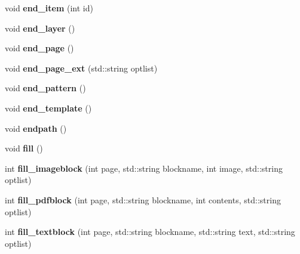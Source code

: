 \begin{DoxyCompactItemize}
\item 
\hypertarget{classPDFlib_a1052c7d1cb2993e32341718e9c36c30c}{void {\bfseries end\-\_\-item} (int id)}\label{classPDFlib_a1052c7d1cb2993e32341718e9c36c30c}

\item 
\hypertarget{classPDFlib_a485ab7dd0996da8194e768e1c97eed21}{void {\bfseries end\-\_\-layer} ()}\label{classPDFlib_a485ab7dd0996da8194e768e1c97eed21}

\item 
\hypertarget{classPDFlib_ad155354f3b07ccf69bc82000211a4018}{void {\bfseries end\-\_\-page} ()}\label{classPDFlib_ad155354f3b07ccf69bc82000211a4018}

\item 
\hypertarget{classPDFlib_aaeb1219f151a8b54e2c02e4e4633856b}{void {\bfseries end\-\_\-page\-\_\-ext} (std\-::string optlist)}\label{classPDFlib_aaeb1219f151a8b54e2c02e4e4633856b}

\item 
\hypertarget{classPDFlib_ac7a93102d044e6c8bd06d2a83c6b66f7}{void {\bfseries end\-\_\-pattern} ()}\label{classPDFlib_ac7a93102d044e6c8bd06d2a83c6b66f7}

\item 
\hypertarget{classPDFlib_a67057f952266b4cbdd737b61a85090f7}{void {\bfseries end\-\_\-template} ()}\label{classPDFlib_a67057f952266b4cbdd737b61a85090f7}

\item 
\hypertarget{classPDFlib_a7d53283bf3787237ca080b1ee6897a26}{void {\bfseries endpath} ()}\label{classPDFlib_a7d53283bf3787237ca080b1ee6897a26}

\item 
\hypertarget{classPDFlib_a0a698c3eb4f96ec63cf9636074fd7870}{void {\bfseries fill} ()}\label{classPDFlib_a0a698c3eb4f96ec63cf9636074fd7870}

\item 
\hypertarget{classPDFlib_a584ee614b174cc35d99f0571227df21a}{int {\bfseries fill\-\_\-imageblock} (int page, std\-::string blockname, int image, std\-::string optlist)}\label{classPDFlib_a584ee614b174cc35d99f0571227df21a}

\item 
\hypertarget{classPDFlib_af9c0c51770f3296907a630314f04dd03}{int {\bfseries fill\-\_\-pdfblock} (int page, std\-::string blockname, int contents, std\-::string optlist)}\label{classPDFlib_af9c0c51770f3296907a630314f04dd03}

\item 
\hypertarget{classPDFlib_ad89aba96aa68737607b7c5f4f419bf33}{int {\bfseries fill\-\_\-textblock} (int page, std\-::string blockname, std\-::string text, std\-::string optlist)}\label{classPDFlib_ad89aba96aa68737607b7c5f4f419bf33}


\end{DoxyCompactItemize}
